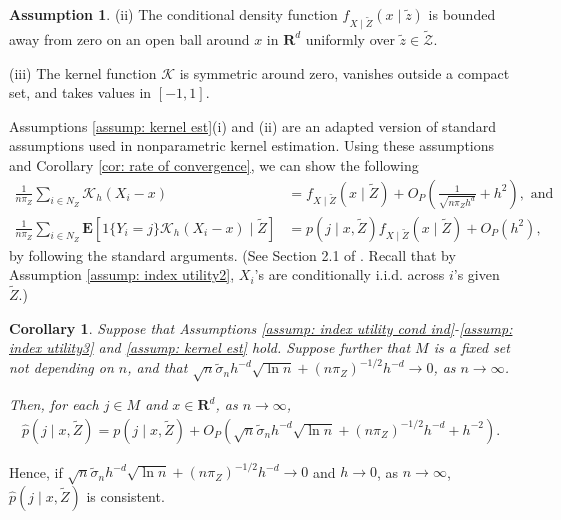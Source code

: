 \documentclass[12pt, fullpage]{amsart}
\newtheorem{corollary}{Corollary}[section]
\theoremstyle{definition}
\theoremstyle{definition}
\newtheorem{assumption}{Assumption}[section]
\theoremstyle{definition}
\begin{document}
\begin{bibunit}[econometrica]
\begin{assumption}
     (ii) The conditional density function $f_{X \mid \tilde Z} (x \mid \tilde z)$ is bounded away from zero on an open ball around $x$ in $\mathbf{R}^d$ uniformly over $\tilde z \in \mathcal{\tilde Z}$. 
	
	(iii) The kernel function $\mathcal{K}$ is symmetric around zero, vanishes outside a compact set, and takes values in $[-1,1]$. 
\end{assumption}

Assumptions \ref{assump: kernel est}(i) and (ii) are an adapted version of standard assumptions used in nonparametric kernel estimation. Using these assumptions and Corollary \ref{cor: rate of convergence}, we can show the following
\begin{align*}
	\frac{1}{n \pi_Z} \sum_{i \in N_Z} \mathcal{K}_h\left( X_i - x \right) &= f_{X \mid \tilde Z}(x \mid \tilde Z) + O_P\left( \frac{1}{\sqrt{n \pi_Z h^d}} + h^2\right), \text{ and }\\
	\frac{1}{n \pi_Z} \sum_{i \in N_Z} \mathbf{E}\left[ 1\{Y_i = j\} \mathcal{K}_h\left( X_i - x \right) \mid \tilde Z\right] &= p(j \mid x,\tilde Z) f_{X \mid \tilde Z}(x \mid \tilde Z) + O_P(h^2),
\end{align*} 
by following the standard arguments. (See Section 2.1 of \cite{Li/Racine:07:NonparamEcon}. Recall that by Assumption \ref{assump: index utility2}, $X_i$'s are conditionally i.i.d. across $i$'s given $\tilde Z$.)

\begin{corollary}
	\label{cor: consistency of matching prob estimators}
	Suppose that Assumptions \ref{assump: index utility cond ind}-\ref{assump: index utility3} and \ref{assump: kernel est} hold. Suppose further that $M$ is a fixed set not depending on $n$, and that $\sqrt{n} \tilde \sigma_n h^{-d} \sqrt{\ln n} + (n \pi_Z)^{-1/2} h^{-d} \rightarrow 0$, as $n \rightarrow \infty$.
	
	Then, for each $j\in M$ and $x \in \mathbf{R}^d$, as $n \rightarrow \infty$,
	\begin{align}
		\hat p(j \mid x,\tilde Z) = p(j \mid x,\tilde Z) + O_P\left(\sqrt{n} \tilde \sigma_n h^{-d} \sqrt{\ln n} + (n \pi_Z)^{-1/2} h^{-d} + h^{-2} \right).
	\end{align}
\end{corollary}

Hence, if $\sqrt{n} \tilde \sigma_n h^{-d} \sqrt{\ln n} + (n \pi_Z)^{-1/2} h^{-d} \rightarrow 0$ and $h \rightarrow 0$, as $n \rightarrow \infty$, $\hat p(j \mid x,\tilde Z)$ is consistent.


\end{bibunit}
\end{document}
